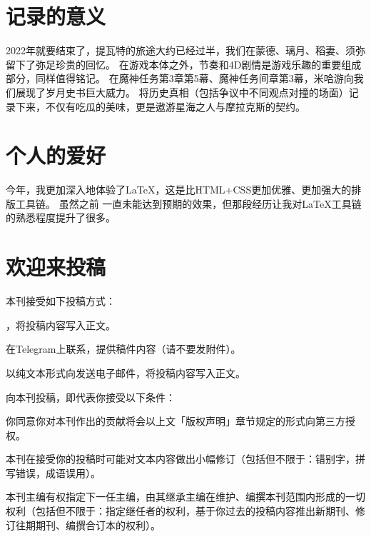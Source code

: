 


\isDraft
{}
\tableofcontents\clearpage







\section*{记录的意义}
2022年就要结束了，提瓦特的旅途大约已经过半，我们在蒙德、璃月、稻妻、须弥留下了弥足珍贵的回忆。
在游戏本体之外，节奏和4D剧情是游戏乐趣的重要组成部分，同样值得铭记。
在魔神任务第3章第5幕、魔神任务间章第3幕，米哈游向我们展现了岁月史书巨大威力。
将历史真相（包括争议中不同观点对撞的场面）记录下来，不仅有吃瓜的美味，更是遨游星海之人与摩拉克斯的契约。

\section*{个人的爱好}
今年，我更加深入地体验了LaTeX，这是比HTML+CSS更加优雅、更加强大的排版工具链。
虽然之前\href{https://neruthesgithubdistweb.vercel.app/qyxt/qyxt/qyxt-2022-02.pdf}{}%
一直未能达到预期的效果，但那段经历让我对LaTeX工具链的熟悉程度提升了很多。

\section*{欢迎来投稿}

本刊接受如下投稿方式：

\begin{compactenum}
	\item \href{https://github.com/neruthes/ysplayerjournal}{}，将投稿内容写入正文。
	\item 在Telegram上联系\CJKecglue\href{https://t.me/neruthes}{}，提供稿件内容（请不要发附件）。
	\item 以纯文本形式向发送电子邮件，将投稿内容写入正文。
\end{compactenum}

向本刊投稿，即代表你接受以下条件：

\begin{compactenum}
	\item 你同意你对本刊作出的贡献将会以上文「版权声明」章节规定的形式向第三方授权。
	\item 本刊在接受你的投稿时可能对文本内容做出小幅修订（包括但不限于：错别字，拼写错误，成语误用）。
	\item 本刊主编有权指定下一任主编，由其继承主编在维护、编撰本刊范围内形成的一切权利（包括但不限于：指定继任者的权利，基于你过去的投稿内容推出新期刊、修订往期期刊、编撰合订本的权利）。
\end{compactenum}








